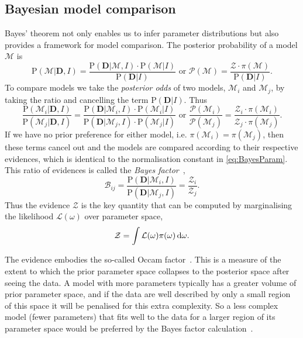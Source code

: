 \subsection{Bayesian model comparison}\label{ssec:BayesModComp}
Bayes' theorem not only enables us to infer parameter distributions but also provides a framework for model comparison.
The posterior probability of a model $\mathcal M$ is
\begin{equation*}
\mathrm{P}(\mathcal M | \mathbf{D}, I) = \frac{\mathrm{P}(\mathbf{D} | \mathcal M, I) \cdot \mathrm{P}(\mathcal M | I)}{\mathrm{P}( \mathbf{D} | I)}
\text{    or    }
\mathcal P(\mathcal M) = \frac{\mathcal Z \cdot \pi(\mathcal M)}{\mathrm{P}(\mathbf{D} | I)}.
\end{equation*}
To compare models we take the \emph{posterior odds} of two models, $\mathcal M_i$ and $\mathcal M_j$, by taking the ratio and cancelling the term $\mathrm{P}( \mathbf{D} | I)$.
Thus
\begin{equation*}
\frac{\mathrm{P}(\mathcal M_i | \mathbf{D}, I)}{\mathrm{P}(\mathcal M_j | \mathbf{D}, I)} = \frac{\mathrm{P}(\mathbf{D} | \mathcal M_i,I) \cdot \mathrm{P}(\mathcal M_i | I)}{\mathrm{P}(\mathbf{D} | \mathcal M_j,I) \cdot \mathrm{P}(\mathcal M_j | I)}
\text{    or    }
\frac{\mathcal P(\mathcal M_i)}{\mathcal P(\mathcal M_j)} = \frac{\mathcal Z_i \cdot \pi(\mathcal M_i)}{\mathcal Z_j \cdot \pi(\mathcal M_j)}.%
\end{equation*}
If we have no prior preference for either model, i.e. $\pi(\mathcal M_i) = \pi(\mathcal M_j)$, then these terms cancel out and the models are compared according to their respective evidences, which is identical to the normalisation constant in \autoref{eq:BayesParam}.
This ratio of evidences is called the \emph{Bayes factor}~\cite{jeffreys1961,kass1995},
\begin{equation*}
\mathcal B_{ij} = \frac{\mathrm{P}(\mathbf{D} | \mathcal M_i, I)}{\mathrm{P}(\mathbf{D} | \mathcal M_j,I)} = \frac{\mathcal Z_i}{\mathcal Z_j}.
\end{equation*}
Thus the evidence $\mathcal Z$ is the key quantity that can be
computed by marginalising the likelihood $\mathcal L(\omega)$ over
parameter space,
\begin{equation*}\label{Zint}
\mathcal Z = \int\mathcal L(\omega) \pi(\omega) \mathop{}\!\mathrm{d} \omega.
\end{equation*}

The evidence embodies the so-called Occam factor~\cite{mackay2003}.
This is a measure of the extent to which the prior parameter space collapses to the posterior space after seeing the data.
A model with more parameters typically has a greater volume of prior parameter space, and if the data are well described by only a small region of this space it will be penalised for this extra complexity.
So a less complex model (fewer parameters) that fits well to the data for a larger region of its parameter space would be preferred by the Bayes factor calculation~\cite{mackay2003}.

